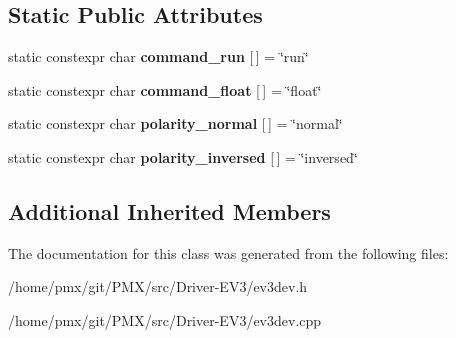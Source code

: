 \subsection*{Static Public Attributes}
\begin{DoxyCompactItemize}
\item 
\mbox{\label{classev3dev_1_1servo__motor_aad437fd4492260dc5a901431c3837d8c}} 
static constexpr char {\bfseries command\+\_\+run} \mbox{[}$\,$\mbox{]} = \char`\"{}run\char`\"{}
\item 
\mbox{\label{classev3dev_1_1servo__motor_ac35134fd013b76ef0e6aadd85c587843}} 
static constexpr char {\bfseries command\+\_\+float} \mbox{[}$\,$\mbox{]} = \char`\"{}float\char`\"{}
\item 
\mbox{\label{classev3dev_1_1servo__motor_a58c502f5d6aa9ebc001bf72196cc4332}} 
static constexpr char {\bfseries polarity\+\_\+normal} \mbox{[}$\,$\mbox{]} = \char`\"{}normal\char`\"{}
\item 
\mbox{\label{classev3dev_1_1servo__motor_a24bca55ddd8170e80b0592db630d8acc}} 
static constexpr char {\bfseries polarity\+\_\+inversed} \mbox{[}$\,$\mbox{]} = \char`\"{}inversed\char`\"{}
\end{DoxyCompactItemize}
\subsection*{Additional Inherited Members}


The documentation for this class was generated from the following files\+:\begin{DoxyCompactItemize}
\item 
/home/pmx/git/\+P\+M\+X/src/\+Driver-\/\+E\+V3/ev3dev.\+h\item 
/home/pmx/git/\+P\+M\+X/src/\+Driver-\/\+E\+V3/ev3dev.\+cpp\end{DoxyCompactItemize}
